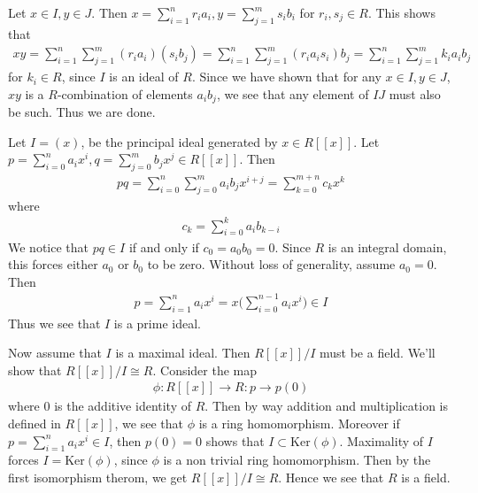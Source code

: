 \documentclass[12pt]{exam}
\theoremstyle{plain} %
\theoremstyle{definition} %
\theoremstyle{remark} %
\begin{document}
\begin{questions}
  \question
  \begin{solution}
    Let $x \in I, y \in J$. Then $x = \sum_{i = 1}^{n} r_i a_i, y =
    \sum_{j = 1}^{m} s_i b_i$ for $r_i, s_j \in R$. This shows that
    \begin{align*}
      xy = \sum_{i = 1}^{n} \sum_{j = 1}^{m} (r_i a_i) (s_i b_j) =
      \sum_{i = 1}^{n} \sum_{j = 1}^{m} (r_i a_i s_i)b_j = \sum_{i =
      1}^{n}  \sum_{j = 1}^{m} k_i a_ib_j
    \end{align*}
    for $k_i \in R$, since $ I$ is an ideal of $R$. Since we have
    shown that for any $x \in I, y \in J$, $xy$ is a $R$-combination
    of elements $a_ib_j$, we see that any element of $IJ$ must also
    be such. Thus we are done.
  \end{solution}

  \question
  \begin{solution}
    Let $I = (x)$, be the principal ideal generated by $x \in
    R[[x]]$. Let $p = \sum_{i = 0}^{n} a_i x^i, q = \sum_{j =
    0}^{m} b_jx^j \in R[[x]]$. Then
    \begin{align*}
      pq = \sum_{i = 0}^{n} \sum_{j = 0}^{m} a_ib_j x^{i + j} =
      \sum_{k = 0}^{m+n} c_k x^k
    \end{align*}
    where
    \begin{align*}
      c_k = \sum_{i = 0}^{k} a_{i}b_{k-i}
    \end{align*}
    We notice that $pq \in I$ if and only if $c_0 = a_0b_0 = 0$.
    Since $R$ is an integral domain, this forces either $a_0$ or
    $b_0$ to be zero. Without loss of generality, assume $a_0 = 0$. Then
    \begin{align*}
      p = \sum_{i = 1}^{n} a_i x^i = x \Big( \sum_{i = 0}^{n-1} a_i
      x^i \Big) \in I
    \end{align*}
    Thus we see that $I$ is a prime ideal.

    Now assume that $I$ is a maximal ideal. Then $R[[x]]/I$ must be a
    field. We'll show that $R[[x]]/I \cong R$. Consider the map
    \begin{align*}
      \phi : R[[x]] \to R : p \to p(0)
    \end{align*}
    where $0$ is the additive identity of $R$. Then by way addition
    and multiplication is defined in $R[[x]]$, we see that $\phi$ is
    a ring homomorphism. Moreover if $p = \sum_{i = 1}^{n} a_i x^i
    \in I$, then $p(0) = 0$ shows that $I \subset
    \textrm{Ker}(\phi)$. Maximality of $I$ forces $I =
    \textrm{Ker}(\phi)$, since $\phi$ is a non trivial ring
    homomorphism. Then by the first isomorphism therom, we get
    $R[[x]]/I \cong R$. Hence we see that $R$ is a field.
  \end{solution}


\end{questions}
\end{document}
